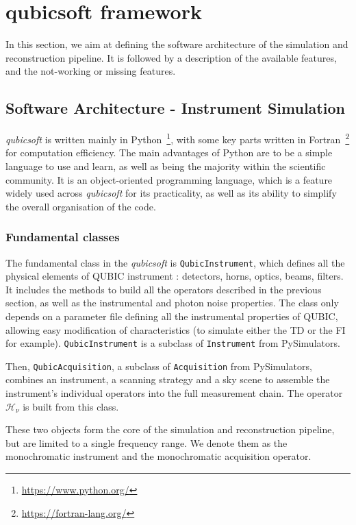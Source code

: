 \documentclass[../../thesis.tex]{subfiles}
\begin{document}
\section{qubicsoft framework}

In this section, we aim at defining the software architecture of the simulation and reconstruction pipeline. It is followed by a description of the available features, and the not-working or missing features.

\subsection{Software Architecture - Instrument Simulation}

\emph{qubicsoft} is written mainly in Python~\footnote{\url{https://www.python.org/}}, with some key parts written in Fortran~\footnote{\url{https://fortran-lang.org/}} for computation efficiency. The main advantages of Python are to be a simple language to use and learn, as well as being the majority within the scientific community. It is an object-oriented programming language, which is a feature widely used across \emph{qubicsoft} for its practicality, as well as its ability to simplify the overall organisation of the code.

\subsubsection{Fundamental classes}

The fundamental class in the \emph{qubicsoft} is \texttt{QubicInstrument}, which defines all the physical elements of QUBIC instrument : detectors, horns, optics, beams, filters. It includes the methods to build all the operators described in the previous section, as well as the instrumental and photon noise properties. The class only depends on a parameter file defining all the instrumental properties of QUBIC, allowing easy modification of characteristics (to simulate either the TD or the FI for example). \texttt{QubicInstrument} is a subclass of \texttt{Instrument} from PySimulators.

Then, \texttt{QubicAcquisition}, a subclass of \texttt{Acquisition} from PySimulators, combines an instrument, a scanning strategy and a sky scene to assemble the instrument's individual operators into the full measurement chain. The operator $\mathcal{H_\nu}$ is built from this class.

These two objects form the core of the simulation and reconstruction pipeline, but are limited to a single frequency range. We denote them as the monochromatic instrument and the monochromatic acquisition operator.
\end{document}
